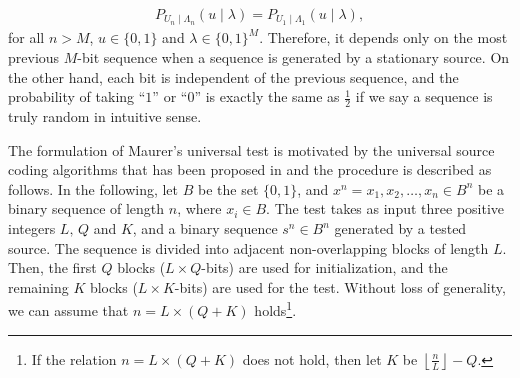 \begin{align}
	P_{U_n\mid\Lambda_n}(u\mid \lambda) = P_{U_1\mid\Lambda_1}(u\mid \lambda),
\end{align}
for all $n>M$, $u\in\{0,1\}$ and $\lambda \in \{0,1\}^M$. 
%
%
Therefore, it depends only on the most previous $M$-bit sequence when a sequence is generated by a stationary source.
%
On the other hand, each bit is independent of the previous sequence, and the probability of taking ``$1$'' or ``$0$'' is exactly the same as $\frac{1}{2}$ if we say a sequence is truly random in intuitive sense.
%
%
\par
%
The formulation of Maurer's universal test is motivated by the universal source coding algorithms that has been proposed in \cite{elias1987interval,willems1989universal} and the procedure is described as follows. In the following, let $B$ be the set $\{0,1\}$, and $x^n = x_1,x_2,\dots,x_n \in B^n$ be a binary sequence of length $n$, where $x_i\in B$. The test takes as input three positive integers $L,\,Q$ and $K$, and a binary sequence $s^n \in B^n$ generated by a tested source. The sequence is divided into adjacent non-overlapping blocks of length $L$. Then, the first $Q$ blocks ($L\times Q$-bits) are used for initialization, and the remaining $K$ blocks ($L\times K$-bits) are used for the test. Without loss of generality, we can assume that $n=L\times(Q+K)$ holds\footnote{%
If the relation $n=L\times(Q+K)$ does not hold, then let $K$ be $\left\lfloor \frac{n}{L} \right\rfloor - Q$.
}. 
